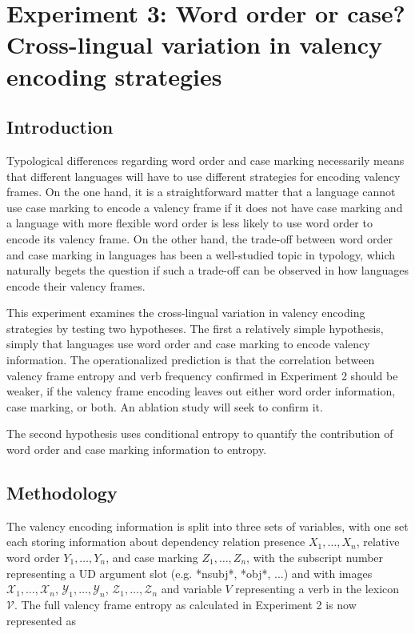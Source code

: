 

\section{Experiment 3: Word order or case? Cross-lingual variation in valency encoding strategies}\label{sec:exp3-ablation}
\subsection{Introduction}

Typological differences regarding word order and case marking necessarily means that different languages will have to use different strategies for encoding valency frames. On the one hand, it is a straightforward matter that a language cannot use case marking to encode a valency frame if it does not have case marking and a language with more flexible word order is less likely to use word order to encode its valency frame. On the other hand, the trade-off between word order and case marking in languages has been a well-studied topic in typology, which naturally begets the question if such a trade-off can be observed in how languages encode their valency frames.

This experiment examines the cross-lingual variation in valency encoding strategies by testing two hypotheses. The first a relatively simple hypothesis, simply that languages use word order and case marking to encode valency information. The operationalized prediction is that the correlation between valency frame entropy and verb frequency confirmed in Experiment 2 should be weaker, if the valency frame encoding leaves out either word order information, case marking, or both. An ablation study will seek to confirm it.

The second hypothesis uses conditional entropy to quantify the contribution of word order and case marking information to entropy.

\subsection{Methodology}

The valency encoding information is split into three sets of variables, with one set each storing information about dependency relation presence $X_1,\ldots,X_n$, relative word order $Y_1,\ldots,Y_n$, and case marking $Z_1,\ldots,Z_n$, with the subscript number representing a UD argument slot (e.g. *nsubj*, *obj*, ...) and with images $\mathcal{X}_{1},\ldots,\mathcal{X}_{n}$,  $\mathcal{Y}_{1},\ldots,\mathcal{Y}_{n}$, $\mathcal{Z}_{1},\ldots,\mathcal{Z}_{n}$ and variable $V$ representing a verb in the lexicon $\mathcal{V}$. The full valency frame entropy as calculated in Experiment 2 is now represented as 

